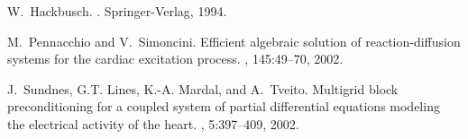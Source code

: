 \documentclass{report}
\begin{document}
\begin{thebibliography}{1}

W.~Hackbusch.
.
\newblock Springer-Verlag, 1994.

M.~Pennacchio and V.~Simoncini.
\newblock Efficient algebraic solution of reaction-diffusion systems for the
cardiac excitation process.
, 145:49--70,
2002.

J.~Sundnes, G.T. Lines, K.-A. Mardal, and A.~Tveito.
\newblock Multigrid block preconditioning for a coupled system of partial
differential equations modeling the electrical activity of the heart.
,
5:397--409, 2002.

\end{thebibliography}
\end{document}

